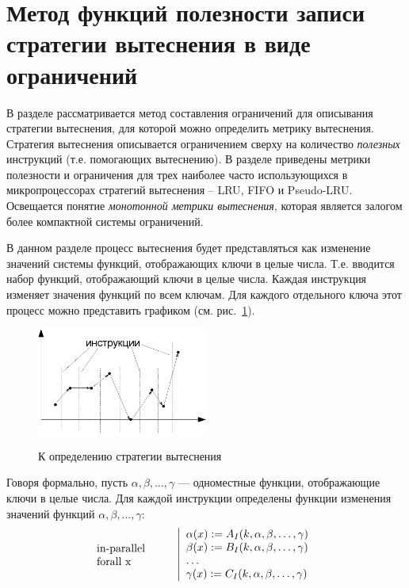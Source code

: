 \documentclass[14pt]{extreport}
\newcommand{\LRU}{\textsf{LRU}\xspace}
\newcommand{\FIFO}{\textsf{FIFO}\xspace}
\newcommand{\PseudoLRU}{\textsf{Pseudo-LRU}\xspace}
\begin{document}

\pagebreak
\section{Метод функций полезности записи стратегии вытеснения в виде
ограничений}\label{sec:usefulness_functions}

{\footnotesize В разделе рассматривается метод составления ограничений для
описывания
стратегии вытеснения, для которой можно определить метрику
вытеснения. Стратегия вытеснения описывается ограничением сверху на
количество \emph{полезных} инструкций (т.е. помогающих вытеснению).
В разделе приведены метрики полезности и ограничения для трех
наиболее часто использующихся в микропроцессорах стратегий
вытеснения -- \LRU, \FIFO и \PseudoLRU. Освещается понятие
\emph{монотонной метрики вытеснения}, которая является залогом более
компактной системы ограничений.}

В данном разделе процесс вытеснения будет представляться как изменение значений
системы функций, отображающих ключи в целые числа. Т.е. вводится набор функций,
отображающий ключи в целые числа. Каждая инструкция изменяет значения функций по
всем ключам. Для каждого отдельного ключа этот процесс можно представить
графиком (см. рис.~\ref{fig:graphic}).

\begin{figure}[h] \center
  \includegraphics[width=0.5\textwidth]{2.theor/graphic}\\
  \caption{К определению стратегии вытеснения}\label{fig:graphic}
\end{figure}

Говоря формально, пусть $\alpha, \beta, \dots, \gamma$ --- одноместные функции,
отображающие ключи в целые числа. Для каждой инструкции определены функции
изменения значений функций $\alpha, \beta, \dots, \gamma$:
$$\parbox{2.5cm}{in-parallel\\forall x~}\left|\begin{array}{l}
\alpha(x) := A_I(k, \alpha, \beta, \dots, \gamma)\\
\beta(x) := B_I(k, \alpha, \beta, \dots, \gamma)\\
\dots\\
\gamma(x) := C_I(k, \alpha, \beta, \dots, \gamma)\\
\end{array}\right.
$$
\end{document}

